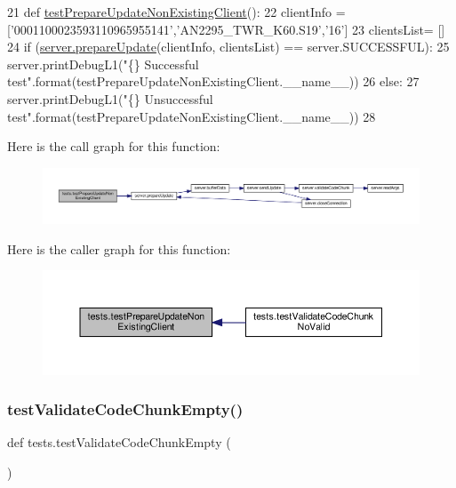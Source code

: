 \begin{DoxyCode}
21 \textcolor{keyword}{def }\hyperlink{namespacetests_a1305f09454544d106db05e825d2ae813}{testPrepareUpdateNonExistingClient}():
22      clientInfo = [\textcolor{stringliteral}{'0001100023593110965955141'},\textcolor{stringliteral}{'AN2295\_TWR\_K60.S19'},\textcolor{stringliteral}{'16'}]
23      clientsList= []
24      \textcolor{keywordflow}{if} (\hyperlink{namespaceserver_a4ab7e63c5f934dfea50b006468f9efca}{server.prepareUpdate}(clientInfo, clientsList) == server.SUCCESSFUL):
25           server.printDebugL1(\textcolor{stringliteral}{"\{\} Successful test"}.format(testPrepareUpdateNonExistingClient.\_\_name\_\_))
26      \textcolor{keywordflow}{else}:
27           server.printDebugL1(\textcolor{stringliteral}{"\{\} Unsuccessful test"}.format(testPrepareUpdateNonExistingClient.\_\_name\_\_))
28 
\end{DoxyCode}
Here is the call graph for this function\+:
\nopagebreak
\begin{figure}[H]
\begin{center}
\leavevmode
\includegraphics[width=350pt]{namespacetests_a1305f09454544d106db05e825d2ae813_cgraph}
\end{center}
\end{figure}
Here is the caller graph for this function\+:
\nopagebreak
\begin{figure}[H]
\begin{center}
\leavevmode
\includegraphics[width=350pt]{namespacetests_a1305f09454544d106db05e825d2ae813_icgraph}
\end{center}
\end{figure}
\mbox{\label{namespacetests_a257095677e195c3499fa13fb7eb08a3e}} 
\subsubsection{\texorpdfstring{test\+Validate\+Code\+Chunk\+Empty()}{testValidateCodeChunkEmpty()}}
{\footnotesize\ttfamily def tests.\+test\+Validate\+Code\+Chunk\+Empty (\begin{DoxyParamCaption}{ }\end{DoxyParamCaption})}


